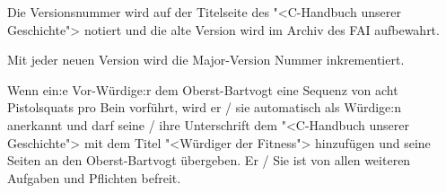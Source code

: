\documentclass[fontsize=12pt,parskip=half]{scrartcl}
\begin{document}
\begin{contract}
  Die Versionsnummer wird auf der Titelseite des "<C-Handbuch unserer Geschichte"> notiert und die alte Version wird im Archiv des FAI aufbewahrt.

  Mit jeder neuen Version wird die Major-Version Nummer inkrementiert.

  \Clause[title={Fittnessklausel}]
  Wenn ein:e Vor-Würdige:r dem Oberst-Bartvogt eine Sequenz von acht Pistolsquats pro Bein vorführt, wird er / sie automatisch als Würdige:n anerkannt und darf seine / ihre Unterschrift
  dem "<C-Handbuch unserer Geschichte"> mit dem Titel "<Würdiger der Fitness"> hinzufügen und seine Seiten an den Oberst-Bartvogt übergeben. Er / Sie ist von allen weiteren
  Aufgaben und Pflichten befreit.

\end{contract}

\pagebreak
\end{document}
